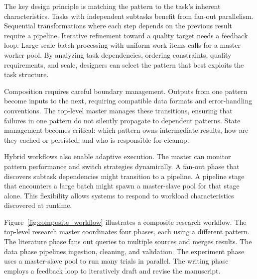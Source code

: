 The key design principle is matching the pattern to the task's inherent characteristics.
Tasks with independent subtasks benefit from fan-out parallelism.
Sequential transformations where each step depends on the previous result require a pipeline.
Iterative refinement toward a quality target needs a feedback loop.
Large-scale batch processing with uniform work items calls for a master-worker pool.
By analyzing task dependencies, ordering constraints, quality requirements, and scale, designers can select the pattern that best exploits the task structure.

Composition requires careful boundary management.
Outputs from one pattern become inputs to the next, requiring compatible data formats and error-handling conventions.
The top-level master manages these transitions, ensuring that failures in one pattern do not silently propagate to dependent patterns.
State management becomes critical: which pattern owns intermediate results, how are they cached or persisted, and who is responsible for cleanup.

Hybrid workflows also enable adaptive execution.
The master can monitor pattern performance and switch strategies dynamically.
A fan-out phase that discovers subtask dependencies might transition to a pipeline.
A pipeline stage that encounters a large batch might spawn a master-slave pool for that stage alone.
This flexibility allows systems to respond to workload characteristics discovered at runtime.

Figure~\ref{fig:composite_workflow} illustrates a composite research workflow.
The top-level research master coordinates four phases, each using a different pattern.
The literature phase fans out queries to multiple sources and merges results.
The data phase pipelines ingestion, cleaning, and validation.
The experiment phase uses a master-slave pool to run many trials in parallel.
The writing phase employs a feedback loop to iteratively draft and revise the manuscript.

